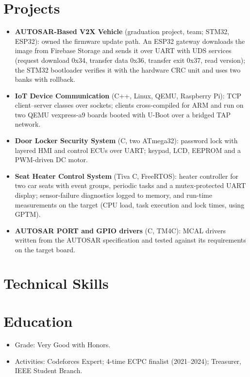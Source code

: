\documentclass[10pt]{article}
\begin{document}
\section*{Projects}
\begin{itemize}
  \item \textbf{AUTOSAR-Based V2X Vehicle} (graduation project, team; STM32, ESP32): owned the firmware update path. An ESP32 gateway downloads the image from Firebase Storage and sends it over UART with UDS services (request download 0x34, transfer data 0x36, transfer exit 0x37, read version); the STM32 bootloader verifies it with the hardware CRC unit and uses two banks with rollback. 
  \item \textbf{IoT Device Communication} (C++, Linux, QEMU, Raspberry Pi): TCP client--server classes over sockets; clients cross-compiled for ARM and run on two QEMU vexpress-a9 boards booted with U-Boot over a bridged TAP network. 
  \item \textbf{Door Locker Security System} (C, two ATmega32): password lock with layered HMI and control ECUs over UART; keypad, LCD, EEPROM and a PWM-driven DC motor. 
  \item \textbf{Seat Heater Control System} (Tiva C, FreeRTOS): heater controller for two car seats with event groups, periodic tasks and a mutex-protected UART display; sensor-failure diagnostics logged to memory, and run-time measurements on the target (CPU load, task execution and lock times, using GPTM). 
  \item \textbf{AUTOSAR PORT and GPIO drivers} (C, TM4C): MCAL drivers written from the AUTOSAR specification and tested against its requirements on the target board.
\end{itemize}

\section*{Technical Skills}

\section*{Education}
\begin{itemize}
  \item Grade: Very Good with Honors.
  \item Activities: Codeforces Expert; 4-time ECPC finalist (2021--2024); Treasurer, IEEE Student Branch.
\end{itemize}
\end{document}
